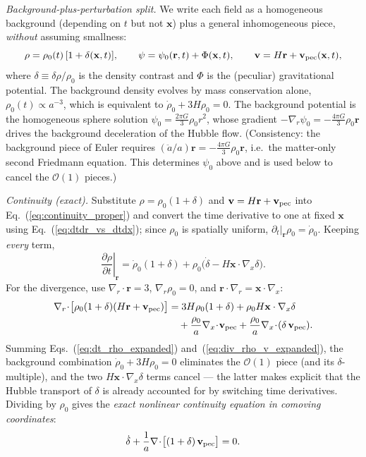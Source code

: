 \documentclass[12pt]{article}
\newcommand{\bx}{\mathbf{x}}
\newcommand{\br}{\mathbf{r}}
\newcommand{\bv}{\mathbf{v}}
\begin{document}
\emph{Background-plus-perturbation split.}  We write each field as a
homogeneous background (depending on $t$ but not $\bx$) plus a general
inhomogeneous piece, \emph{without} assuming smallness:
%
\begin{equation}
  \rho = \rho_0(t)\,[1+\delta(\bx,t)],
  \qquad
  \psi = \psi_0(\br,t) + \Phi(\bx,t),
  \qquad
  \bv = H\br + \bv_{\rm pec}(\bx,t),
  \label{eq:bg_plus_pert}
\end{equation}
%
where $\delta \equiv \delta\rho/\rho_0$ is the density contrast and
$\Phi$ is the (peculiar) gravitational potential.  The background
density evolves by mass conservation alone, $\rho_0(t) \propto
a^{-3}$, which is equivalent to $\dot\rho_0 + 3H\rho_0 = 0$.  The
background potential is the homogeneous sphere solution
$\psi_0 = \tfrac{2\pi G}{3}\rho_0 r^2$, whose gradient
$-\nabla_r\psi_0 = -\tfrac{4\pi G}{3}\rho_0\br$ drives the background
deceleration of the Hubble flow.  (Consistency: the background piece
of Euler requires $(\ddot a/a)\br = -\tfrac{4\pi G}{3}\rho_0\br$,
i.e.\ the matter-only second Friedmann equation.  This determines
$\psi_0$ above and is used below to cancel the $\mathcal{O}(1)$
pieces.)

\emph{Continuity (exact).}  Substitute
$\rho = \rho_0(1+\delta)$ and $\bv = H\br + \bv_{\rm pec}$ into
Eq.~(\ref{eq:continuity_proper}) and convert the time derivative to
one at fixed $\bx$ using Eq.~(\ref{eq:dtdr_vs_dtdx}); since $\rho_0$
is spatially uniform, $\partial_t|_\br\rho_0 = \dot\rho_0$.  Keeping
\emph{every} term,
%
\begin{equation}
  \left.\frac{\partial\rho}{\partial t}\right|_\br
  = \dot\rho_0(1+\delta)
    + \rho_0\bigl(\dot\delta - H\bx\cdot\nabla_x\delta\bigr).
  \label{eq:dt_rho_expanded}
\end{equation}
%
For the divergence, use $\nabla_r\cdot\br = 3$, $\nabla_r\rho_0 = 0$,
and $\br\cdot\nabla_r = \bx\cdot\nabla_x$:
%
\begin{align}
  \nabla_r\!\cdot\!\bigl[\rho_0(1+\delta)(H\br + \bv_{\rm pec})\bigr]
  &= 3H\rho_0(1+\delta)
    + \rho_0 H\bx\cdot\nabla_x\delta
    \notag\\
  &\quad{}+ \frac{\rho_0}{a}\nabla_x\!\cdot\!\bv_{\rm pec}
    + \frac{\rho_0}{a}\nabla_x\!\cdot\!(\delta\,\bv_{\rm pec}).
  \label{eq:div_rho_v_expanded}
\end{align}
%
Summing Eqs.~(\ref{eq:dt_rho_expanded})
and~(\ref{eq:div_rho_v_expanded}), the background combination
$\dot\rho_0 + 3H\rho_0 = 0$ eliminates the $\mathcal{O}(1)$ piece
(and its $\delta$-multiple), and the two $H\bx\cdot\nabla_x\delta$
terms cancel --- the latter makes explicit that the Hubble transport
of $\delta$ is already accounted for by switching time derivatives.
Dividing by $\rho_0$ gives the \emph{exact nonlinear continuity
equation in comoving coordinates}:
%
\begin{equation}
  \dot\delta + \frac{1}{a}\nabla\!\cdot\!\bigl[(1+\delta)\,\bv_{\rm pec}\bigr] = 0.
  \label{eq:continuity_nonlin}
\end{equation}
\end{document}

